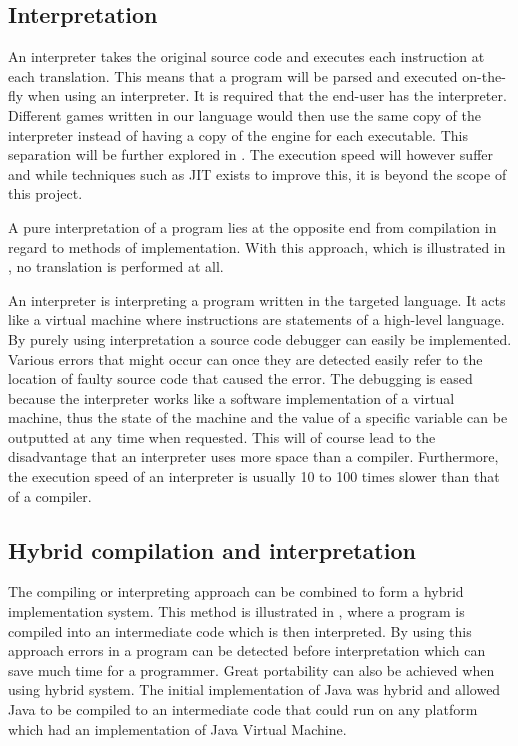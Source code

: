 
\subsection{Interpretation}
\label{sec:interpretation}
An interpreter takes the original source code and executes each instruction at
each translation. This means that a program will be parsed and executed
on-the-fly when using an interpreter. It is required that the end-user has the
interpreter. Different games written in our language would then use the same
copy of the interpreter instead of having a copy of the engine for each
executable. This separation will be further explored in
. The execution speed will however suffer and
while techniques such as JIT exists to improve this, it is beyond the scope of
this project.

A pure interpretation of a program lies at the opposite end from compilation in
regard to methods of implementation. With this approach, which is illustrated in
, no translation is performed at all.



An interpreter is interpreting a program written in the targeted language. It
acts like a virtual machine where instructions are statements of a high-level
language. By purely using interpretation a source code debugger can easily be
implemented. Various errors that might occur can once they are detected easily
refer to the location of faulty source code that caused the error. The debugging is
eased because the interpreter works like a software implementation of a virtual
machine, thus the state of the machine and the value of a specific variable can
be outputted at any time when requested. This will of course lead to the
disadvantage that an interpreter uses more space than a compiler. Furthermore,
the execution speed of an interpreter is usually 10 to 100 times slower than
that of a compiler.
\cite[p. 48]{sebesta2013}

\subsection{Hybrid compilation and interpretation}
The compiling or interpreting approach can be combined to form a hybrid
implementation system. This method is illustrated in
, where a program is compiled into an
intermediate code which is then interpreted. By using this approach errors in a
program can be detected before interpretation which can save much time for a
programmer. Great portability can also be achieved when using hybrid system.
The initial implementation of Java was hybrid and allowed Java to be compiled to
an intermediate code that could run on any platform which had an implementation
of Java Virtual Machine.
\cite[p. 50]{sebesta2013}

